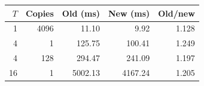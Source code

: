 \begin{center}
\begin{tabular}{rrrrr}
\toprule
$T$ & Copies & Old (ms) & New (ms) & Old/new \\
\midrule
1 & 4096 & 11.10 & 9.92 & 1.128 \\
4 & 1 & 125.75 & 100.41 & 1.249 \\
4 & 128 & 294.47 & 241.09 & 1.197 \\
16 & 1 & 5002.13 & 4167.24 & 1.205 \\
\bottomrule
\end{tabular}
\end{center}
